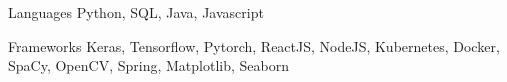 
\begin{cvskills}
  \cvskill
    {Languages} %
    {Python, SQL, Java, Javascript} %

  \cvskill
    {Frameworks} %
    {Keras, Tensorflow, Pytorch, ReactJS, NodeJS, Kubernetes, Docker, SpaCy, OpenCV, Spring, Matplotlib, Seaborn} %
    
\end{cvskills}
